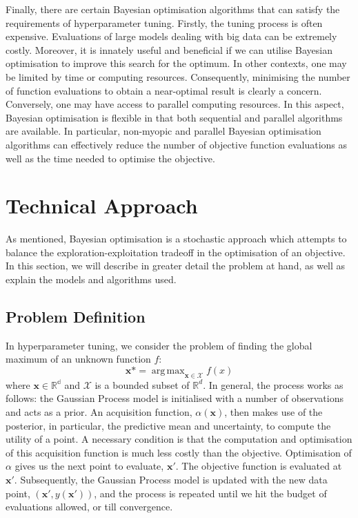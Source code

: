 \documentclass[letterpaper]{article}
\DeclareMathOperator*{\argmax}{arg\,max}
\begin{document}
Finally, there are certain Bayesian optimisation algorithms that can satisfy the
requirements of hyperparameter tuning. Firstly, the tuning process is often
expensive. Evaluations of large models dealing with big data can be extremely
costly. Moreover, it is innately useful and beneficial if we can utilise
Bayesian optimisation to improve this search for the optimum. In other contexts,
one may be limited by time or computing resources. Consequently, minimising the
number of function evaluations to obtain a near-optimal result is clearly a concern.
Conversely, one may have access to parallel computing resources. In this aspect,
Bayesian optimisation is flexible in that both sequential and parallel algorithms
are available. In particular, non-myopic and parallel Bayesian optimisation
algorithms can effectively reduce the number of objective function evaluations
as well as the time needed to optimise the objective.

\section{Technical Approach}
As mentioned, Bayesian optimisation is a stochastic approach which attempts to
balance the exploration-exploitation tradeoff in the optimisation of an objective.
In this section, we will describe in greater detail the problem at hand, as well
as explain the models and algorithms used.

\subsection{Problem Definition}
In hyperparameter tuning, we consider the problem of finding the global maximum of
an unknown function $f$:
$$\textbf{x*}=\argmax_{\textbf{x}\in\mathcal{X}}{f(x)}$$
where $\textbf{x} \in \mathbb{R^d}$ and $\mathcal{X}$ is a bounded subset of 
$\mathbb{R}^d$. In general, the process works as follows: the Gaussian Process model
is initialised with a number of observations and acts as a prior.
An acquisition function, $\alpha(\textbf{x})$, then makes use
of the posterior, in particular, the predictive mean and uncertainty,
to compute the utility of a point. A necessary condition is that the computation and
optimisation of this acquisition function is much less costly than the objective.
Optimisation of $\alpha$ gives us the next point to evaluate, $\textbf{x}'$. The
objective function is evaluated at $\textbf{x}'$. Subsequently, the Gaussian Process 
model is updated with the new data point, $(\textbf{x}', y(\textbf{x}'))$, and the
process is repeated until we hit the budget of evaluations allowed, or till
convergence.
\end{document}
